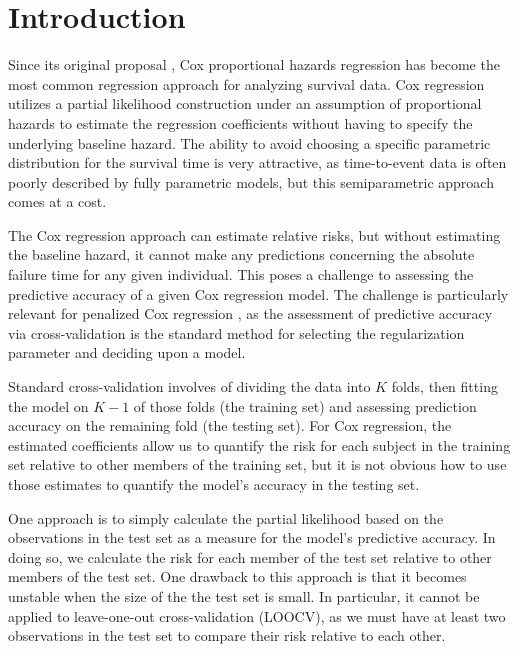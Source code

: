 \section{Introduction}
Since its original proposal \citep{Cox1972}, Cox proportional hazards regression has become the most common regression approach for analyzing survival data.  Cox regression utilizes a partial likelihood construction under an assumption of proportional hazards to estimate the regression coefficients without having to specify the underlying baseline hazard.  The ability to avoid choosing a specific parametric distribution for the survival time is very attractive, as time-to-event data is often poorly described by fully parametric models, but this semiparametric approach comes at a cost.

The Cox regression approach can estimate relative risks, but without estimating the baseline hazard, it cannot make any predictions concerning the absolute failure time for any given individual.  This poses a challenge to assessing the predictive accuracy of a given Cox regression model.  The challenge is particularly relevant for penalized Cox regression \citep{Tibshirani1997,Fan2002}, as the assessment of predictive accuracy via cross-validation is the standard method for selecting the regularization parameter and deciding upon a model.

Standard cross-validation involves of dividing the data into $K$ folds, then fitting the model on $K-1$ of those folds (the training set) and assessing prediction accuracy on the remaining fold (the testing set).  For Cox regression, the estimated coefficients allow us to quantify the risk for each subject in the training set relative to other members of the training set, but it is not obvious how to use those estimates to quantify the model's accuracy in the testing set.

One approach is to simply calculate the partial likelihood based on the observations in the test set as a measure for the model's predictive accuracy.  In doing so, we calculate the risk for each member of the test set relative to other members of the test set.  One drawback to this approach is that it becomes unstable when the size of the the test set is small.  In particular, it cannot be applied to leave-one-out cross-validation (LOOCV), as we must have at least two observations in the test set to compare their risk relative to each other.


